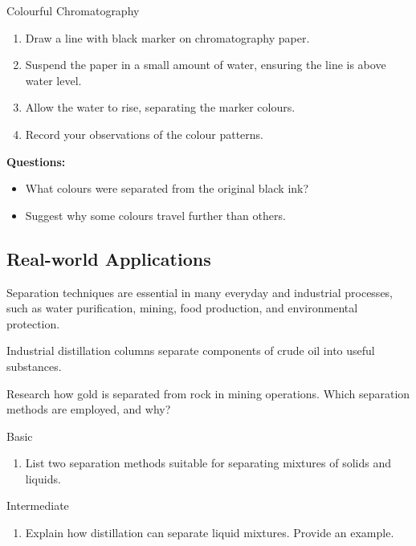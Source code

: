 \begin{investigation}{Colourful Chromatography}
\begin{enumerate}
    \item Draw a line with black marker on chromatography paper.
    \item Suspend the paper in a small amount of water, ensuring the line is above water level.
    \item Allow the water to rise, separating the marker colours.
    \item Record your observations of the colour patterns.
\end{enumerate}

\textbf{Questions:}
\begin{itemize}
    \item What colours were separated from the original black ink?
    \item Suggest why some colours travel further than others.
\end{itemize}
\end{investigation}

\subsection{Real-world Applications}
Separation techniques are essential in many everyday and industrial processes, such as water purification, mining, food production, and environmental protection.

\begin{marginfigure}
\centering
\caption{Industrial distillation columns separate components of crude oil into useful substances.}
\label{fig:industrial_distillation}
\end{marginfigure}

\begin{challenge}
Research how gold is separated from rock in mining operations. Which separation methods are employed, and why?
\end{challenge}

\begin{tieredquestions}{Basic}
\begin{enumerate}
    \item List two separation methods suitable for separating mixtures of solids and liquids.
\end{enumerate}
\end{tieredquestions}

\begin{tieredquestions}{Intermediate}
\begin{enumerate}
    \item Explain how distillation can separate liquid mixtures. Provide an example.
\end{enumerate}
\end{tieredquestions}

